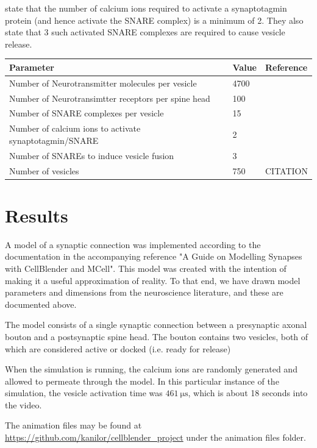 \documentclass[a4paper]{article}
\begin{document}
\cite{Dittrich:BiophysJ:2013} state that the number of calcium ions required to activate a synaptotagmin protein (and hence activate the SNARE complex) is a minimum of 2. They also state that 3 such activated SNARE complexes are required to cause vesicle release. 

\begin{table}[H]
\begin{tabular}{lll}
Parameter & Value & Reference \\ \hline
Number of Neurotransmitter molecules per vesicle & 4700&\cite{Bruns:Nature:1995} \\
Number of Neurotransimtter receptors per spine head & 100 & \cite{Stricker:JPhysiol:1996} \\
Number of SNARE complexes per vesicle & 15 & \cite{Wilhelm:Science:2014} \\ 
Number of calcium ions to activate synaptotagmin/SNARE & 2 & \cite{Dittrich:BiophysJ:2013} \\
Number of SNAREs to induce vesicle fusion & 3 & \cite{Dittrich:BiophysJ:2013} \\  
Number of vesicles & 750 & CITATION\\
\end{tabular}
\end{table}

\section{Results}
A model of a synaptic connection was implemented according to the documentation in the accompanying reference "A Guide on Modelling Synapses with CellBlender and MCell". This model was created with the intention of making it a useful approximation of reality. To that end, we have drawn model parameters and dimensions from the neuroscience literature, and these are documented above.

The model consists of a single synaptic connection between a presynaptic axonal bouton and a postsynaptic spine head. The bouton contains two vesicles, both of which are considered active or docked (i.e. ready for release)

When the simulation is running, the calcium ions are randomly generated and allowed to permeate through the model. In this particular instance of the simulation, the vesicle activation time was $\SI{461}{\micro\second}$, which is about 18 seconds into the video.

The animation files may be found at \url{https://github.com/kanilor/cellblender_project} under the animation files folder.
\end{document}
